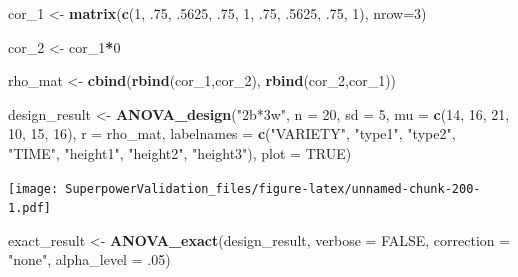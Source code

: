 \documentclass[]{book}
\newenvironment{Shaded}{\begin{snugshade}}{\end{snugshade}}
\newcommand{\DataTypeTok}[1]{\textcolor[rgb]{0.13,0.29,0.53}{#1}}
\newcommand{\DecValTok}[1]{\textcolor[rgb]{0.00,0.00,0.81}{#1}}
\newcommand{\FloatTok}[1]{\textcolor[rgb]{0.00,0.00,0.81}{#1}}
\newcommand{\KeywordTok}[1]{\textcolor[rgb]{0.13,0.29,0.53}{\textbf{#1}}}
\newcommand{\NormalTok}[1]{#1}
\newcommand{\OperatorTok}[1]{\textcolor[rgb]{0.81,0.36,0.00}{\textbf{#1}}}
\newcommand{\OtherTok}[1]{\textcolor[rgb]{0.56,0.35,0.01}{#1}}
\newcommand{\StringTok}[1]{\textcolor[rgb]{0.31,0.60,0.02}{#1}}
\begin{document}
\begin{Shaded}
\begin{Highlighting}[]
\NormalTok{cor_}\DecValTok{1}\NormalTok{ <-}\StringTok{ }\KeywordTok{matrix}\NormalTok{(}\KeywordTok{c}\NormalTok{(}\DecValTok{1}\NormalTok{, }\FloatTok{.75}\NormalTok{, }\FloatTok{.5625}\NormalTok{,}
                  \FloatTok{.75}\NormalTok{, }\DecValTok{1}\NormalTok{, }\FloatTok{.75}\NormalTok{,}
                  \FloatTok{.5625}\NormalTok{, }\FloatTok{.75}\NormalTok{, }\DecValTok{1}\NormalTok{), }\DataTypeTok{nrow=}\DecValTok{3}\NormalTok{)}

\NormalTok{cor_}\DecValTok{2}\NormalTok{ <-}\StringTok{ }\NormalTok{cor_}\DecValTok{1}\OperatorTok{*}\DecValTok{0}

\NormalTok{rho_mat <-}\StringTok{ }\KeywordTok{cbind}\NormalTok{(}\KeywordTok{rbind}\NormalTok{(cor_}\DecValTok{1}\NormalTok{,cor_}\DecValTok{2}\NormalTok{),}
                      \KeywordTok{rbind}\NormalTok{(cor_}\DecValTok{2}\NormalTok{,cor_}\DecValTok{1}\NormalTok{))}

\NormalTok{design_result <-}\StringTok{ }\KeywordTok{ANOVA_design}\NormalTok{(}\StringTok{"2b*3w"}\NormalTok{,}
                              \DataTypeTok{n =} \DecValTok{20}\NormalTok{,}
                              \DataTypeTok{sd =} \DecValTok{5}\NormalTok{,}
                              \DataTypeTok{mu =} \KeywordTok{c}\NormalTok{(}\DecValTok{14}\NormalTok{, }\DecValTok{16}\NormalTok{, }\DecValTok{21}\NormalTok{,}
                                     \DecValTok{10}\NormalTok{, }\DecValTok{15}\NormalTok{, }\DecValTok{16}\NormalTok{),}
                              \DataTypeTok{r =}\NormalTok{ rho_mat,}
                              \DataTypeTok{labelnames =} \KeywordTok{c}\NormalTok{(}\StringTok{"VARIETY"}\NormalTok{, }
                                             \StringTok{"type1"}\NormalTok{, }\StringTok{"type2"}\NormalTok{,}
                                             \StringTok{"TIME"}\NormalTok{, }
                                             \StringTok{"height1"}\NormalTok{, }\StringTok{"height2"}\NormalTok{, }
                                             \StringTok{"height3"}\NormalTok{),}
                              \DataTypeTok{plot =} \OtherTok{TRUE}\NormalTok{)}
\end{Highlighting}
\end{Shaded}

\texttt{[image: SuperpowerValidation\_files/figure-latex/unnamed-chunk-200-1.pdf]}

\begin{Shaded}
\begin{Highlighting}[]
\NormalTok{exact_result <-}\StringTok{ }\KeywordTok{ANOVA_exact}\NormalTok{(design_result, }\DataTypeTok{verbose =} \OtherTok{FALSE}\NormalTok{,}
                            \DataTypeTok{correction =} \StringTok{"none"}\NormalTok{,}
                            \DataTypeTok{alpha_level =} \FloatTok{.05}\NormalTok{)}
\end{Highlighting}
\end{Shaded}
\end{document}
